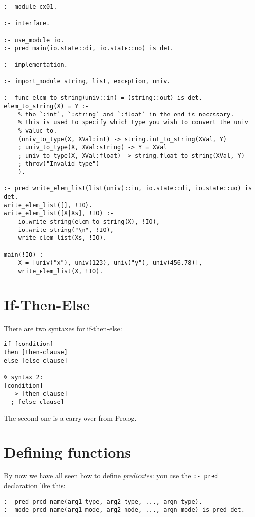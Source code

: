 \begin{lstlisting}[language=Mercury]
:- module ex01.

:- interface.

:- use_module io.
:- pred main(io.state::di, io.state::uo) is det.

:- implementation.

:- import_module string, list, exception, univ.

:- func elem_to_string(univ::in) = (string::out) is det.
elem_to_string(X) = Y :-
    % the `:int`, `:string` and `:float` in the end is necessary.
    % this is used to specify which type you wish to convert the univ
    % value to.
	(univ_to_type(X, XVal:int) -> string.int_to_string(XVal, Y)
	; univ_to_type(X, XVal:string) -> Y = XVal
	; univ_to_type(X, XVal:float) -> string.float_to_string(XVal, Y)
	; throw("Invalid type")
	).

:- pred write_elem_list(list(univ)::in, io.state::di, io.state::uo) is det.
write_elem_list([], !IO).
write_elem_list([X|Xs], !IO) :-
	io.write_string(elem_to_string(X), !IO),
	io.write_string("\n", !IO),
	write_elem_list(Xs, !IO).

main(!IO) :-
	X = [univ("x"), univ(123), univ("y"), univ(456.78)],
	write_elem_list(X, !IO).
\end{lstlisting}

\section{If-Then-Else}

There are two syntaxes for if-then-else:

\begin{lstlisting}[language=Mercury]
% syntax 1:
if [condition]
then [then-clause]
else [else-clause]

% syntax 2:
[condition]
  -> [then-clause]
  ; [else-clause]
\end{lstlisting}

The second one is a carry-over from Prolog.

\section{Defining functions}

By now we have all seen how to define \textit{predicates}: you use the \texttt{:- pred} declaration like this:

\begin{lstlisting}
:- pred pred_name(arg1_type, arg2_type, ..., argn_type).
:- mode pred_name(arg1_mode, arg2_mode, ..., argn_mode) is pred_det.
\end{lstlisting}

